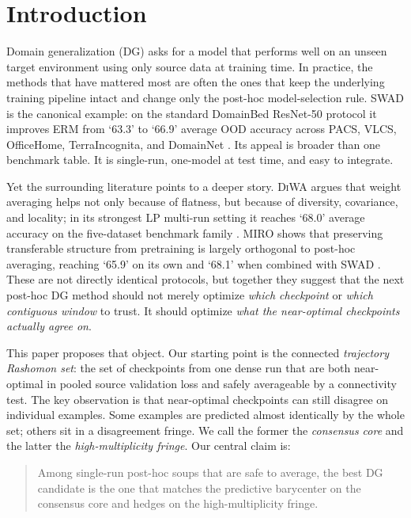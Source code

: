 \documentclass{article}
\newcommand{\ood}{OOD}
\newcommand{\swad}{\textup{\textsc{SWAD}}}
\newcommand{\diwa}{\textup{\textsc{DiWA}}}
\newcommand{\miro}{\textup{\textsc{MIRO}}}
\begin{document}
\section{Introduction}

Domain generalization (DG) asks for a model that performs well on an unseen target environment using only source data at training time. In practice, the methods that have mattered most are often the ones that keep the underlying training pipeline intact and change only the post-hoc model-selection rule. \swad{} \citep{cha2021swad} is the canonical example: on the standard DomainBed ResNet-50 protocol it improves ERM from `63.3' to `66.9' average \ood{} accuracy across PACS, VLCS, OfficeHome, TerraIncognita, and DomainNet \citep{cha2021swad}. Its appeal is broader than one benchmark table. It is single-run, one-model at test time, and easy to integrate.

Yet the surrounding literature points to a deeper story. \diwa{} \citep{rame2022diwa} argues that weight averaging helps not only because of flatness, but because of diversity, covariance, and locality; in its strongest LP multi-run setting it reaches `68.0' average accuracy on the five-dataset benchmark family \citep{rame2022diwa}. \miro{} \citep{cha2022miro} shows that preserving transferable structure from pretraining is largely orthogonal to post-hoc averaging, reaching `65.9' on its own and `68.1' when combined with \swad{} \citep{cha2022miro}. These are not directly identical protocols, but together they suggest that the next post-hoc DG method should not merely optimize \emph{which checkpoint} or \emph{which contiguous window} to trust. It should optimize \emph{what the near-optimal checkpoints actually agree on}.

This paper proposes that object. Our starting point is the connected \emph{trajectory Rashomon set}: the set of checkpoints from one dense run that are both near-optimal in pooled source validation loss and safely averageable by a connectivity test. The key observation is that near-optimal checkpoints can still disagree on individual examples. Some examples are predicted almost identically by the whole set; others sit in a disagreement fringe. We call the former the \emph{consensus core} and the latter the \emph{high-multiplicity fringe}. Our central claim is:
\begin{quote}
Among single-run post-hoc soups that are safe to average, the best DG candidate is the one that matches the predictive barycenter on the consensus core and hedges on the high-multiplicity fringe.
\end{quote}
\end{document}
